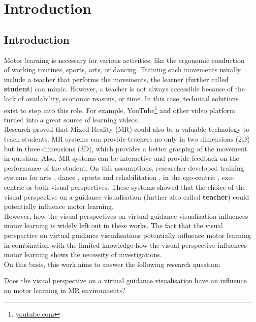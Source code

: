 \chapter{Introduction}

\section{Introduction}

Motor learning is necessary for various activities, like the ergonomic conduction of working routines, sports, arts, or dancing. Training such movements usually include a teacher that performs the movements, the learner (further called \textbf{student}) can mimic. However, a teacher is not always accessible because of the lack of availability, economic reasons, or time. In this case, technical solutions exist to step into this role. For example, YouTube\footnote{\href{https://www.youtube.com/}{youtube.com}} and other video platform turned into a great source of learning videos.\\
Research proved that Mixed Reality (MR) could also be a valuable technology to teach students. MR systems can provide teachers no only in two dimensions (2D) but in three dimensions (3D), which provides a better grasping of the movement in question. Also, MR systems can be interactive and provide feedback on the performance of the student. On this assumptions, researcher developed training systems for arts \cite{Han2016, Komura2006, Chua}, dance \cite{Yan2015, Chan2010, Hachimura2004}, sports \cite{Covaci2014, Kojima2014} and rehabilitation \cite{Chinthammit2014, Tang2015, Rajanna2015}, in the ego-centric \cite{Yang2002, Katzakis2017, Scavo2015}, exo-centric \cite{Han2017, Velloso2013, Lieberman2007} or both \cite{Sousa2016, Hoang2016, Sodhi2012} visual perspectives. These systems showed that the choice of the visual perspective on a guidance visualisation (further also called \textbf{teacher}) could potentially influence motor learning.\\
However, how the visual perspectives on virtual guidance visualisation influences motor learning is widely left out in these works. The fact that the visual perspective on virtual guidance visualisations potentially influence motor learning in combination with the limited knowledge how the visual perspective influences motor learning shows the necessity of investigations.\\
On this basis, this work aims to answer the following research question:
\begin{tcolorbox}[colback=red!30!white]
	Does the visual perspective on a virtual guidance visualisation have an influence on motor learning in MR environments?
\end{tcolorbox}
